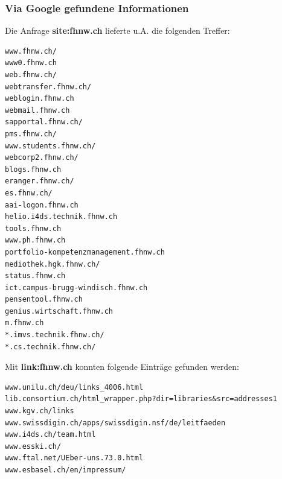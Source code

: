 \documentclass[11pt,a4paper]{scrartcl}
\begin{document}
\subsubsection{Via Google gefundene Informationen}
Die Anfrage \textbf{site:fhnw.ch} lieferte u.A. die folgenden Treffer:
\begin{lstlisting}
www.fhnw.ch/
www0.fhnw.ch
web.fhnw.ch/
webtransfer.fhnw.ch/
weblogin.fhnw.ch
webmail.fhnw.ch
sapportal.fhnw.ch/
pms.fhnw.ch/
www.students.fhnw.ch/
webcorp2.fhnw.ch/
blogs.fhnw.ch
eranger.fhnw.ch/
es.fhnw.ch/
aai-logon.fhnw.ch
helio.i4ds.technik.fhnw.ch
tools.fhnw.ch
www.ph.fhnw.ch
portfolio-kompetenzmanagement.fhnw.ch
mediothek.hgk.fhnw.ch/
status.fhnw.ch
ict.campus-brugg-windisch.fhnw.ch
pensentool.fhnw.ch
genius.wirtschaft.fhnw.ch
m.fhnw.ch
*.imvs.technik.fhnw.ch/
*.cs.technik.fhnw.ch/
\end{lstlisting}
Mit \textbf{link:fhnw.ch} konnten folgende Einträge gefunden werden:
\begin{lstlisting}
www.unilu.ch/deu/links_4006.html
lib.consortium.ch/html_wrapper.php?dir=libraries&src=addresses1
www.kgv.ch/links
www.swissdigin.ch/apps/swissdigin.nsf/de/leitfaeden
www.i4ds.ch/team.html
www.esski.ch/
www.ftal.net/UEber-uns.73.0.html
www.esbasel.ch/en/impressum/
\end{lstlisting}
\end{document}
